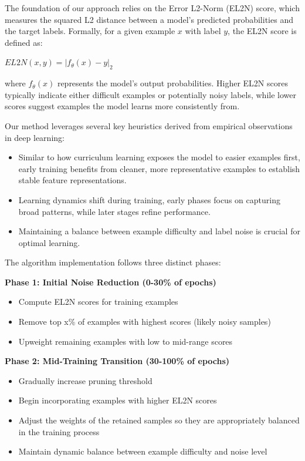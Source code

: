\documentclass{article}
\begin{document}
The foundation of our approach relies on the Error L2-Norm (EL2N) score, which measures the squared L2 distance between a model's predicted probabilities and the target labels. Formally, for a given example $x$ with label $y$, the EL2N score is defined as:

$EL2N(x,y) = |f_\theta(x) - y|_2$

where $f_\theta(x)$ represents the model's output probabilities. Higher EL2N scores typically indicate either difficult examples or potentially noisy labels, while lower scores suggest examples the model learns more consistently from.

Our method leverages several key heuristics derived from empirical observations in deep learning:

\begin{itemize}
    \item Similar to how curriculum learning exposes the model to easier examples first, early training benefits from cleaner, more representative examples to establish stable feature representations.
    \item Learning dynamics shift during training, early phases focus on capturing broad patterns, while later stages refine performance.
    \item Maintaining a balance between example difficulty and label noise is crucial for optimal learning.
\end{itemize}

The algorithm implementation follows three distinct phases:

\textbf{Phase 1: Initial Noise Reduction (0-30\% of epochs)} 
\begin{itemize} 
    \item Compute EL2N scores for training examples 
    \item Remove top x\% of examples with highest scores (likely noisy samples) 
    \item Upweight remaining examples with low to mid-range scores 
\end{itemize}

\textbf{Phase 2: Mid-Training Transition (30-100\% of epochs)} 
\begin{itemize} 
    \item Gradually increase pruning threshold 
    \item Begin incorporating examples with higher EL2N scores 
    \item Adjust the weights of the retained samples so they are appropriately balanced in the training process
    \item Maintain dynamic balance between example difficulty and noise level 
\end{itemize}
\end{document}
